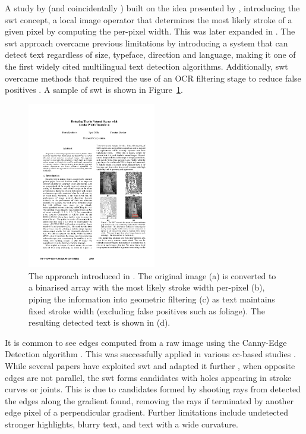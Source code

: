 A study by \citet{Epshtein:2010tj} (and coincidentally \citet{Zhang:2011cl}) built on the idea presented by \citeauthor{Subramanian:2007tf}, introducing the \gls{swt} concept, a local image operator that determines the most likely stroke of a given pixel by computing the per-pixel width. This was later expanded in \citet{Srivastav:2008ge}. The \gls{swt} approach overcame previous limitations by introducing a system that can detect text regardless of size, typeface, direction and language, making it one of the first widely cited multilingual text detection algorithms. Additionally, \gls{swt} overcame methods that required the use of an OCR filtering stage to reduce false positives \citep{Chen:2004tx, XiangrongChen:2004ha, Ye:2005wu}. A sample of \gls{swt} is shown in Figure~\ref{fig:background:detection:cc:epshtein2010_swt}.

\begin{figure}[h]
  \centering
  \includegraphics[width=0.5\textwidth]{images/background/epshtein2010_swt}
  \caption[Stroke Width Transformation from \citet{Epshtein:2010tj}]{The  approach introduced in \citep{Epshtein:2010tj}. The original image (a) is converted to a binarised array with the most likely stroke width per-pixel (b), piping the information into geometric filtering (c) as text maintains fixed stroke width (excluding false positives such as foliage). The resulting detected text is shown in (d).}
  \label{fig:background:detection:cc:epshtein2010_swt}
\end{figure}

It is common to see edges computed from a raw image using the Canny-Edge Detection algorithm \citep{Canny:1986uw}. This was successfully applied in various \gls{cc}-based studies \citep{Epshtein:2010tj, Chen:2011ul, Zhang:2010wa}. While several papers have exploited \gls{swt} and adapted it further \cite{Shivakumara:2011dn, Zhang:2011cl}, when opposite edges are not parallel, the \gls{swt} forms candidates with holes appearing in stroke curves or joints. This is due to candidates formed by shooting rays from detected the edges along the gradient found, removing the rays if terminated by another edge pixel of a perpendicular gradient. Further limitations include undetected stronger highlights, blurry text, and text with a wide curvature.


